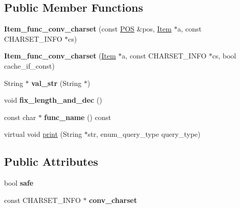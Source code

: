 \subsection*{Public Member Functions}
\begin{DoxyCompactItemize}
\item 
\mbox{\label{classItem__func__conv__charset_a6ae02a928ba593635a756248dd523046}} 
{\bfseries Item\+\_\+func\+\_\+conv\+\_\+charset} (const \mbox{\hyperlink{structYYLTYPE}{P\+OS}} \&pos, \mbox{\hyperlink{classItem}{Item}} $\ast$a, const C\+H\+A\+R\+S\+E\+T\+\_\+\+I\+N\+FO $\ast$cs)
\item 
\mbox{\label{classItem__func__conv__charset_a60be056676d46b70044fadce9e26277a}} 
{\bfseries Item\+\_\+func\+\_\+conv\+\_\+charset} (\mbox{\hyperlink{classItem}{Item}} $\ast$a, const C\+H\+A\+R\+S\+E\+T\+\_\+\+I\+N\+FO $\ast$cs, bool cache\+\_\+if\+\_\+const)
\item 
\mbox{\label{classItem__func__conv__charset_a656f43fea4631a5875e7949d5136a509}} 
String $\ast$ {\bfseries val\+\_\+str} (String $\ast$)
\item 
\mbox{\label{classItem__func__conv__charset_a8f701877fbebe16a08936d690ee75d6c}} 
void {\bfseries fix\+\_\+length\+\_\+and\+\_\+dec} ()
\item 
\mbox{\label{classItem__func__conv__charset_a6f2aca60f3c00fe8b5fe569af1b76552}} 
const char $\ast$ {\bfseries func\+\_\+name} () const
\item 
virtual void \mbox{\hyperlink{classItem__func__conv__charset_ac8281c66d90d6a9b818dde781f63d28f}{print}} (String $\ast$str, enum\+\_\+query\+\_\+type query\+\_\+type)
\end{DoxyCompactItemize}
\subsection*{Public Attributes}
\begin{DoxyCompactItemize}
\item 
\mbox{\label{classItem__func__conv__charset_ac608d5d7e7be8073eae2895e1ef4cd66}} 
bool {\bfseries safe}
\item 
\mbox{\label{classItem__func__conv__charset_a600dc5b9128769619fadd58c0804e0eb}} 
const C\+H\+A\+R\+S\+E\+T\+\_\+\+I\+N\+FO $\ast$ {\bfseries conv\+\_\+charset}
\end{DoxyCompactItemize}
